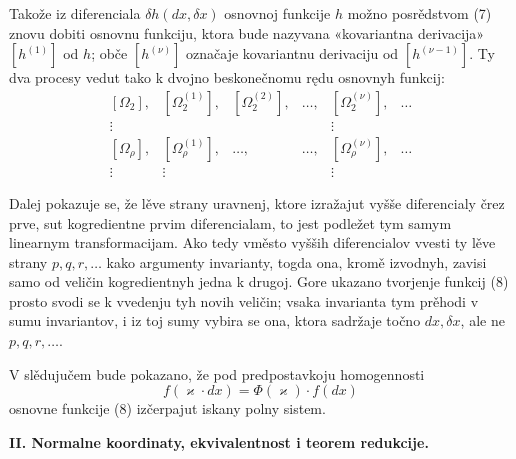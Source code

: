 \documentclass[11pt]{article}
\begin{document}
Takože iz diferenciala \(\delta h(dx,\delta x)\) osnovnoj funkcije \(h\) možno posrědstvom (7) znovu dobiti osnovnu funkciju, ktora bude nazyvana «kovariantna derivacija» \([h^{(1)}]\) od \(h\); obče \([h^{(\nu)}]\) označaje kovariantnu derivaciju od \([h^{(\nu-1)}]\). Ty dva procesy vedut tako k dvojno beskonečnomu rędu osnovnyh funkcij:
\begin{equation}
\begin{array}{cccccc}
[\Omega_2], & [\Omega_2^{(1)}], & [\Omega_2^{(2)}], & \ldots,
& [\Omega_2^{(\nu)}], & \ldots\\
\vdots &&&& \vdots&\\
{}[\Omega_\rho], & [\Omega_\rho^{(1)}], & \ldots, & \ldots,
& [\Omega_\rho^{(\nu)}], & \ldots\\
\vdots & \vdots &&& \vdots&
\end{array}
\tag{8}
\end{equation}

Dalej pokazuje se, že lěve strany uravnenj, ktore izražajut vyšše diferencialy črez prve, sut kogredientne prvim diferencialam, to jest podležet tym samym linearnym transformacijam. Ako tedy vměsto vyšših diferencialov vvesti ty lěve strany \(p,q,r,\ldots\) kako argumenty invarianty, togda ona, kromě izvodnyh, zavisi samo od veličin kogredientnyh jedna k drugoj. Gore ukazano tvorjenje funkcij (8) prosto svodi se k vvedenju tyh novih veličin; vsaka invarianta tym prěhodi v sumu invariantov, i iz toj sumy vybira se ona, ktora sadržaje točno \(dx,\delta x\), ale ne \(p,q,r,\ldots\).

V slědujučem bude pokazano, že pod predpostavkoju homogennosti
\[
f(\varkappa\cdot dx)=\Phi(\varkappa)\cdot f(dx)
\]
osnovne funkcije (8) izčerpajut iskany polny sistem.

\begin{center}
\textbf{II. Normalne koordinaty, ekvivalentnost i teorem redukcije.}
\end{center}
\end{document}
